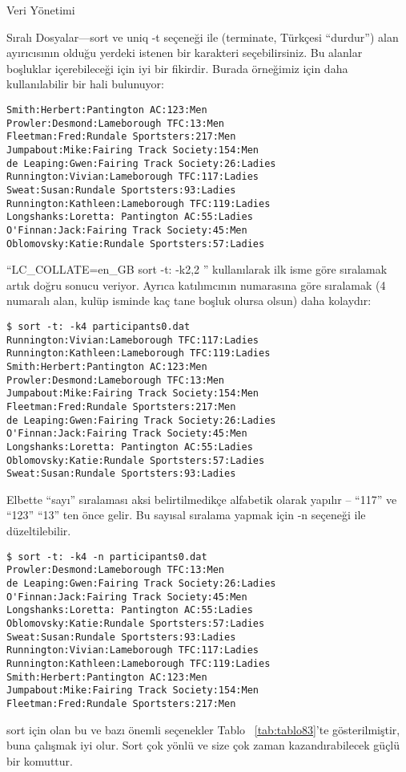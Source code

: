 \begin{section}{Veri Yönetimi}
\begin{subsection}{Sıralı Dosyalar—sort ve uniq}
-t seçeneği ile (terminate, Türkçesi “durdur”) alan ayırıcısının olduğu yerdeki istenen bir karakteri seçebilirsiniz. Bu alanlar boşluklar içerebileceği için iyi bir fikirdir. Burada örneğimiz için daha kullanılabilir bir hali bulunuyor:
\begin{verbatim}
Smith:Herbert:Pantington AC:123:Men
Prowler:Desmond:Lameborough TFC:13:Men
Fleetman:Fred:Rundale Sportsters:217:Men
Jumpabout:Mike:Fairing Track Society:154:Men
de Leaping:Gwen:Fairing Track Society:26:Ladies
Runnington:Vivian:Lameborough TFC:117:Ladies
Sweat:Susan:Rundale Sportsters:93:Ladies
Runnington:Kathleen:Lameborough TFC:119:Ladies
Longshanks:Loretta: Pantington AC:55:Ladies
O'Finnan:Jack:Fairing Track Society:45:Men
Oblomovsky:Katie:Rundale Sportsters:57:Ladies
\end{verbatim}

“LC\_COLLATE=en\_GB sort -t: -k2,2 ” kullanılarak ilk isme göre sıralamak artık doğru sonucu veriyor. Ayrıca katılımcının numarasına göre sıralamak (4 numaralı alan, kulüp isminde kaç tane boşluk olursa olsun) daha kolaydır:
\begin{verbatim}
$ sort -t: -k4 participants0.dat
Runnington:Vivian:Lameborough TFC:117:Ladies
Runnington:Kathleen:Lameborough TFC:119:Ladies
Smith:Herbert:Pantington AC:123:Men
Prowler:Desmond:Lameborough TFC:13:Men
Jumpabout:Mike:Fairing Track Society:154:Men
Fleetman:Fred:Rundale Sportsters:217:Men
de Leaping:Gwen:Fairing Track Society:26:Ladies
O'Finnan:Jack:Fairing Track Society:45:Men
Longshanks:Loretta: Pantington AC:55:Ladies
Oblomovsky:Katie:Rundale Sportsters:57:Ladies
Sweat:Susan:Rundale Sportsters:93:Ladies
\end{verbatim}

Elbette “sayı” sıralaması aksi belirtilmedikçe alfabetik olarak yapılır – “117” ve “123” “13” ten önce gelir. Bu sayısal sıralama yapmak için -n seçeneği ile düzeltilebilir.
\begin{verbatim}
$ sort -t: -k4 -n participants0.dat
Prowler:Desmond:Lameborough TFC:13:Men
de Leaping:Gwen:Fairing Track Society:26:Ladies
O'Finnan:Jack:Fairing Track Society:45:Men
Longshanks:Loretta: Pantington AC:55:Ladies
Oblomovsky:Katie:Rundale Sportsters:57:Ladies
Sweat:Susan:Rundale Sportsters:93:Ladies
Runnington:Vivian:Lameborough TFC:117:Ladies
Runnington:Kathleen:Lameborough TFC:119:Ladies
Smith:Herbert:Pantington AC:123:Men
Jumpabout:Mike:Fairing Track Society:154:Men
Fleetman:Fred:Rundale Sportsters:217:Men
\end{verbatim}

sort için olan bu ve bazı önemli seçenekler Tablo ~\ref{tab:tablo83}'te gösterilmiştir, buna çalışmak iyi olur. Sort çok yönlü ve size çok zaman kazandırabilecek güçlü bir komuttur.

\end{subsection}
\end{section}
